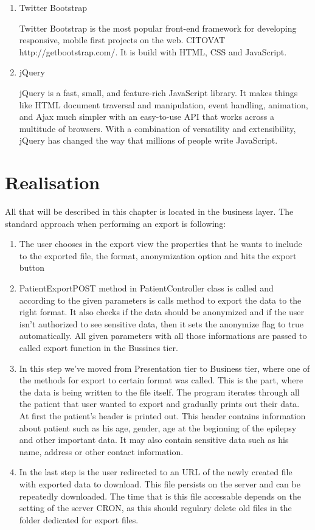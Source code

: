 \documentclass[thesis=B,english]{FITthesis}[2012/10/20]
\begin{document}
\begin{enumerate}
\item{Twitter Bootstrap}

Twitter Bootstrap is the most popular front-end framework for developing responsive, mobile first projects on the web. CITOVAT http://getbootstrap.com/. It is build with HTML, CSS and JavaScript.

\item{jQuery}

jQuery is a fast, small, and feature-rich JavaScript library. It makes things like HTML document traversal and manipulation, event handling, animation, and Ajax much simpler with an easy-to-use API that works across a multitude of browsers. With a combination of versatility and extensibility, jQuery has changed the way that millions of people write \cite{JJ92} JavaScript.
\end{enumerate}

\chapter{Realisation}
All that will be described in this chapter is located in the business layer. The standard approach when performing an export is following:

\begin{enumerate}
\item{ The user chooses in the export view the properties that he wants to include to the exported file, the format, anonymization option and hits the export button }
\item{ PatientExportPOST method in PatientController class is called and according to the given parameters is calls method to export the data to the right format. It also checks if the data should be anonymized and if the user isn't authorized to see sensitive data, then it sets the anonymize flag to true automatically. All given parameters with all those informations are passed to called export function in the Bussines tier.}
\item{ In this step we've moved from Presentation tier to Business tier, where one of the methods for export to certain format was called. This is the part, where the data is being written to the file itself. The program iterates through all the patient that user wanted to export and gradually prints out their data.}
At first the patient's header is printed out. This header contains information about patient such as his age, gender, age at the beginning of the epilepsy and other important data. It may also contain sensitive data such as his name, address or other contact information.
\item{ In the last step is the user redirected to an URL of the newly created file with exported data to download. This file persists on the server and can be repeatedly downloaded. The time that is this file accessable depends on the setting of the server CRON, as this should regulary delete old files in the folder dedicated for export files.}

\end{enumerate}
\end{document}
